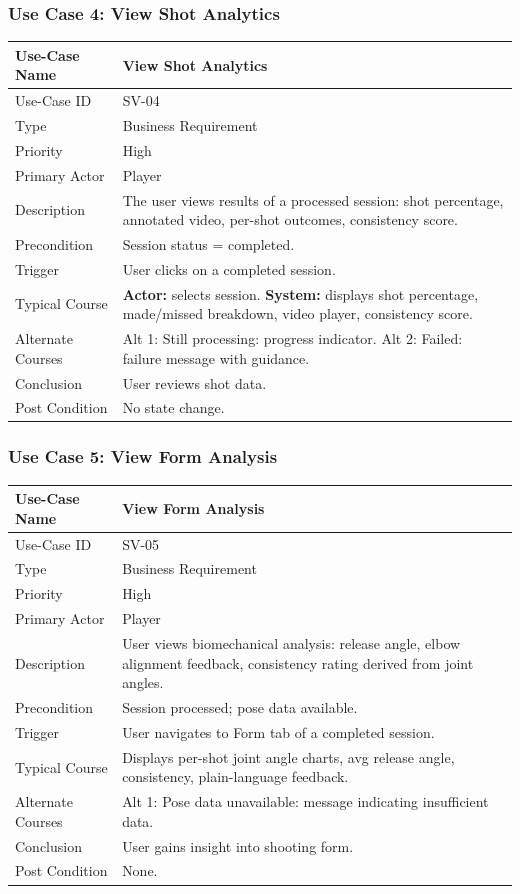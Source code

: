 ﻿\documentclass[11pt,a4paper]{article}
\begin{document}
\subsubsection*{Use Case 4: View Shot Analytics}
\begin{longtable}{|L{3.5cm}|L{11cm}|}
\hline
Use-Case Name & View Shot Analytics \\ \hline
Use-Case ID & SV-04 \\ \hline
Type & Business Requirement \\ \hline
Priority & High \\ \hline
Primary Actor & Player \\ \hline
Description & The user views results of a processed session: shot percentage, annotated video, per-shot outcomes, consistency score. \\ \hline
Precondition & Session status = completed. \\ \hline
Trigger & User clicks on a completed session. \\ \hline
Typical Course & \textbf{Actor:} selects session. \textbf{System:} displays shot percentage, made/missed breakdown, video player, consistency score. \\ \hline
Alternate Courses & Alt 1: Still processing: progress indicator. Alt 2: Failed: failure message with guidance. \\ \hline
Conclusion & User reviews shot data. \\ \hline
Post Condition & No state change. \\ \hline
\end{longtable}

\subsubsection*{Use Case 5: View Form Analysis}
\begin{longtable}{|L{3.5cm}|L{11cm}|}
\hline
Use-Case Name & View Form Analysis \\ \hline
Use-Case ID & SV-05 \\ \hline
Type & Business Requirement \\ \hline
Priority & High \\ \hline
Primary Actor & Player \\ \hline
Description & User views biomechanical analysis: release angle, elbow alignment feedback, consistency rating derived from joint angles. \\ \hline
Precondition & Session processed; pose data available. \\ \hline
Trigger & User navigates to Form tab of a completed session. \\ \hline
Typical Course & Displays per-shot joint angle charts, avg release angle, consistency, plain-language feedback. \\ \hline
Alternate Courses & Alt 1: Pose data unavailable: message indicating insufficient data. \\ \hline
Conclusion & User gains insight into shooting form. \\ \hline
Post Condition & None. \\ \hline
\end{longtable}
\end{document}
